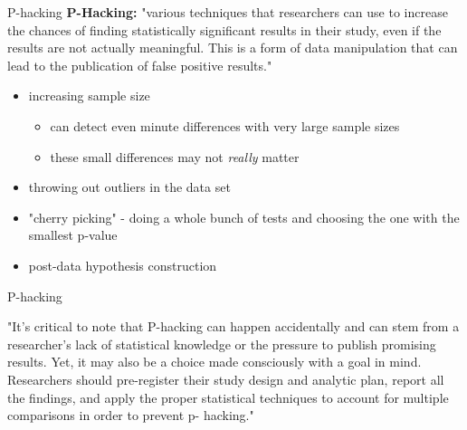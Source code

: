\documentclass{beamer}
\begin{document}
\begin{frame}{P-hacking}
\textbf{P-Hacking:} "various techniques that researchers can use to increase the chances of finding statistically significant results in their study, even if the results are not actually meaningful. This is a form of data manipulation that can lead to the publication of false positive results."\footnotemark
\begin{itemize}
    \item increasing sample size
    \begin{itemize}
        \item can detect even minute differences with very large sample sizes
        \item these small differences may not \textit{really} matter
    \end{itemize}
    \item throwing out outliers in the data set
    \item "cherry picking" - doing a whole bunch of tests and choosing the one with the smallest p-value
    \item post-data hypothesis construction
\end{itemize}
\end{frame}

\begin{frame}{P-hacking}
\begin{center}
"It’s critical to note that P-hacking can happen accidentally and can stem from a researcher’s lack of statistical knowledge or the pressure to publish promising results. Yet, it may also be a choice made consciously with a goal in mind. Researchers should pre-register their study design and analytic plan, report all the findings, and apply the proper statistical techniques to account for multiple comparisons in order to prevent p- hacking." \footnotemark
\end{center}

\end{frame}
\end{document}
